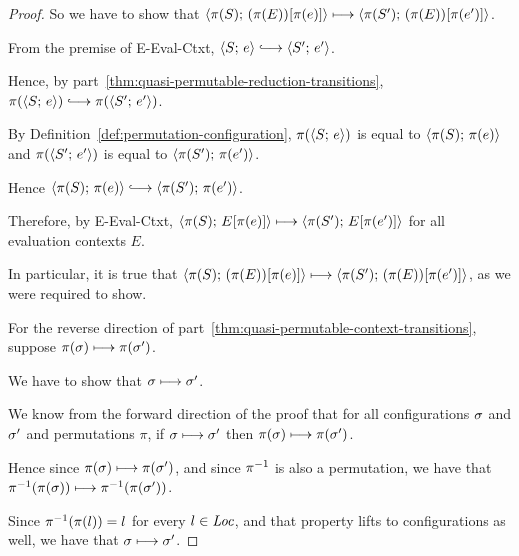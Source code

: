 \begin{proof}
  So we have to show that
  $\langle \pi(S);\, (\pi(E))\hspace{-0.5mm}\left[\pi(e)\right] \rangle \longmapsto
  \langle \pi(S');\, (\pi(E))\hspace{-0.5mm}\left[\pi(e')\right] \rangle$.

  From the premise of {\sc E-Eval-Ctxt}, $\config{S}{e} \parstepsto
  \config{S'}{e'}$.

  Hence, by part~\ref{thm:quasi-permutable-reduction-transitions},
  $\pi(\config{S}{e}) \parstepsto \pi(\config{S'}{e'})$.

  By Definition~\ref{def:permutation-configuration},
  $\pi(\langle S;\, e \rangle)$ is equal to $\langle \pi(S);\, \pi(e) \rangle$ and
  $\pi(\langle S';\, e' \rangle)$ is equal to $\langle \pi(S');\, \pi(e') \rangle$.

  Hence $\config{\pi(S)}{\pi(e)} \parstepsto
  \config{\pi(S')}{\pi(e')}$.

  Therefore, by {\sc E-Eval-Ctxt}, $\langle \pi(S);\, E\hspace{-0.5mm}\left[\pi(e)\right] \rangle
  \longmapsto \langle \pi(S');\, E\hspace{-0.5mm}\left[\pi(e')\right] \rangle$ for all evaluation
  contexts $E$.

  In particular, it is true that
  $\langle \pi(S);\, (\pi(E))\hspace{-0.5mm}\left[\pi(e)\right] \rangle \longmapsto
  \langle \pi(S');\, (\pi(E))\hspace{-0.5mm}\left[\pi(e')\right] \rangle$, as we were required
  to show.

  For the reverse direction of
  part~\ref{thm:quasi-permutable-context-transitions}, suppose
  $\pi(\sigma) \longmapsto \pi(\sigma')$.

  We have to show that $\sigma \longmapsto \sigma'$.

  We know from the forward direction of the proof that for all
  configurations $\sigma$ and $\sigma'$ and permutations $\pi$, if
  $\sigma \longmapsto \sigma'$ then $\pi(\sigma) \longmapsto
  \pi(\sigma')$.

  Hence since $\pi(\sigma) \longmapsto \pi(\sigma')$, and since $\pi^{-1}$
  is also a permutation, we have that $\pi^{-1}(\pi(\sigma)) \longmapsto
  \pi^{-1}(\pi(\sigma'))$.

  Since $\pi^{-1}(\pi(l)) = l$ for every $l \in \mathit{Loc}$, and that property
  lifts to configurations as well, we have that $\sigma \longmapsto
  \sigma'$.

\end{proof}
